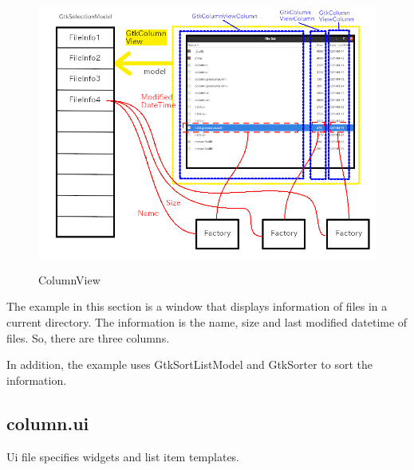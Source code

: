 \begin{figure}
\centering
\includegraphics[width=12cm,height=9cm]{../image/column.png}
\caption{ColumnView}
\end{figure}

The example in this section is a window that displays information of
files in a current directory. The information is the name, size and last
modified datetime of files. So, there are three columns.

In addition, the example uses GtkSortListModel and GtkSorter to sort the
information.

\subsection{column.ui}\label{column.ui}

Ui file specifies widgets and list item templates.


